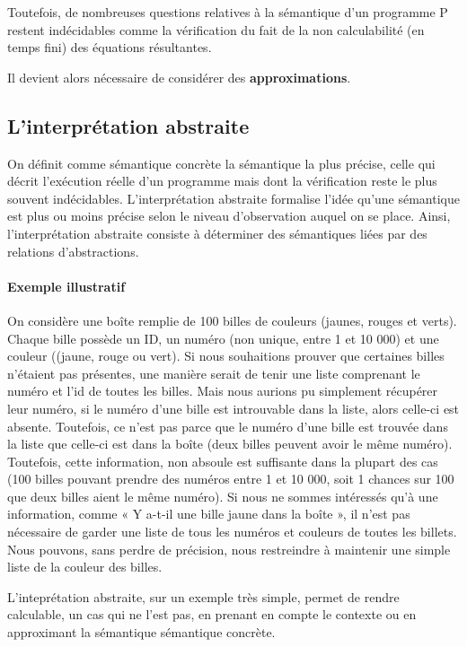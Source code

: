 \documentclass[french]{report}
\begin{document}
Toutefois, de nombreuses questions relatives à la sémantique d'un programme P restent indécidables
comme la vérification du fait de la non calculabilité (en temps fini) des équations résultantes.

Il devient alors nécessaire de considérer des \textbf{approximations}.

\subsection{L'interprétation abstraite}
On définit comme sémantique concrète la sémantique la plus précise, celle qui décrit l'exécution
réelle d'un programme mais dont la vérification reste le plus souvent indécidables.
L’interprétation abstraite formalise l’idée qu’une sémantique est plus ou moins précise
selon le niveau d’observation auquel on se place. Ainsi, l'interprétation abstraite consiste à
déterminer des sémantiques liées par des relations d'abstractions.

\paragraph{Exemple illustratif}
On considère une boîte remplie de 100 billes de couleurs (jaunes, rouges et verts).
Chaque bille possède un ID, un numéro (non unique, entre 1 et 10 000)
et une couleur ((jaune, rouge ou vert).
Si nous souhaitions prouver que certaines billes n'étaient pas présentes, une manière serait
de tenir une liste comprenant le numéro et l'id de toutes les billes.
Mais nous aurions pu simplement récupérer leur numéro, si le numéro d'une bille est introuvable dans la liste,
alors celle-ci est absente. Toutefois, ce n'est pas parce que le numéro d'une bille est
trouvée dans la liste que celle-ci est dans la boîte (deux billes peuvent avoir le
même numéro). Toutefois, cette information, non absoule est suffisante dans la plupart
des cas (100 billes pouvant prendre des numéros entre 1 et 10 000, soit 1 chances sur 100 que deux billes aient
le même numéro).
Si nous ne sommes intéressés qu'à une information,
comme « Y a-t-il une bille jaune dans la boîte », il n'est
pas nécessaire de garder une liste de tous les numéros et couleurs de toutes les billets.
Nous pouvons, sans perdre de précision, nous
restreindre à maintenir une simple liste de la couleur des billes.

L'inteprétation abstraite, sur un exemple très simple, permet de rendre calculable, un cas qui ne l'est pas,
en prenant en compte le contexte ou en approximant la sémantique sémantique concrète. \\
\end{document}
